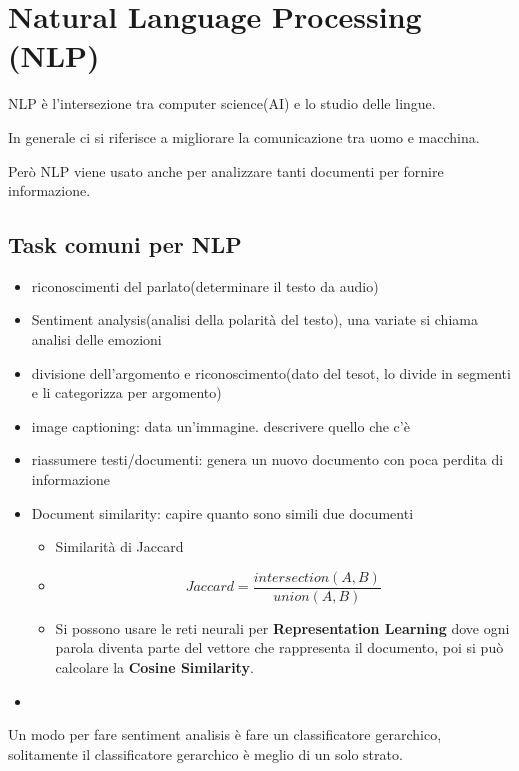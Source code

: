 \section{Natural Language
Processing (NLP)}
NLP è l'intersezione tra computer science(AI) e lo studio delle lingue.

In generale ci si riferisce a migliorare la comunicazione tra uomo e macchina.

Però NLP viene usato anche per analizzare tanti documenti per fornire informazione.


\subsection{Task comuni per NLP}
\begin{itemize}
    \item riconoscimenti del parlato(determinare il testo da audio)
    \item Sentiment analysis(analisi della polarità del testo), una
    variate si chiama analisi delle emozioni
    \item divisione dell'argomento e riconoscimento(dato del tesot, lo divide in segmenti
    e li categorizza per argomento)
    \item image captioning: data un'immagine. descrivere quello che c'è
    \item riassumere testi/documenti: genera un nuovo documento con poca perdita di
    informazione
    \item Document similarity: capire quanto sono simili due documenti
    \begin{itemize}
        \item Similarità di Jaccard
        \item \begin{equation}
                  Jaccard = \frac{intersection(A,B)}{union(A,B)}
        \end{equation}
        \item Si possono usare le reti neurali per \textbf{Representation Learning}
        dove ogni parola diventa parte del vettore che rappresenta il documento, poi
        si può calcolare la \textbf{Cosine Similarity}.
    \end{itemize}
    \item
\end{itemize}

Un modo per fare sentiment analisis è fare un classificatore gerarchico,
solitamente il classificatore gerarchico è meglio di un solo strato.

